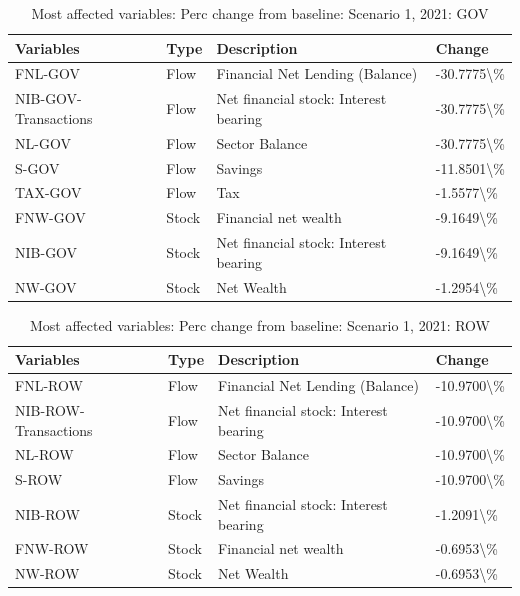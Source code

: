 \documentclass[
]{book}
\begin{document}
\begin{table}

\caption{\label{tab:most-affected-scenario-1-perc-2020-GOV}Most affected variables: Perc change from baseline: Scenario 1, 2021: GOV}
\centering
\fontsize{10}{12}\selectfont
\begin{tabular}[t]{l|l|l|l}
\hline
Variables & Type & Description & Change\\
\hline
FNL-GOV & Flow & Financial Net Lending (Balance) & -30.7775\textbackslash{}\%\\
\hline
NIB-GOV-Transactions & Flow & Net financial stock: Interest bearing & -30.7775\textbackslash{}\%\\
\hline
NL-GOV & Flow & Sector Balance & -30.7775\textbackslash{}\%\\
\hline
S-GOV & Flow & Savings & -11.8501\textbackslash{}\%\\
\hline
TAX-GOV & Flow & Tax & -1.5577\textbackslash{}\%\\
\hline
FNW-GOV & Stock & Financial net wealth & -9.1649\textbackslash{}\%\\
\hline
NIB-GOV & Stock & Net financial stock: Interest bearing & -9.1649\textbackslash{}\%\\
\hline
NW-GOV & Stock & Net Wealth & -1.2954\textbackslash{}\%\\
\hline
\end{tabular}
\end{table}

\begin{table}

\caption{\label{tab:most-affected-scenario-1-perc-2020-ROW}Most affected variables: Perc change from baseline: Scenario 1, 2021: ROW}
\centering
\fontsize{10}{12}\selectfont
\begin{tabular}[t]{l|l|l|l}
\hline
Variables & Type & Description & Change\\
\hline
FNL-ROW & Flow & Financial Net Lending (Balance) & -10.9700\textbackslash{}\%\\
\hline
NIB-ROW-Transactions & Flow & Net financial stock: Interest bearing & -10.9700\textbackslash{}\%\\
\hline
NL-ROW & Flow & Sector Balance & -10.9700\textbackslash{}\%\\
\hline
S-ROW & Flow & Savings & -10.9700\textbackslash{}\%\\
\hline
NIB-ROW & Stock & Net financial stock: Interest bearing & -1.2091\textbackslash{}\%\\
\hline
FNW-ROW & Stock & Financial net wealth & -0.6953\textbackslash{}\%\\
\hline
NW-ROW & Stock & Net Wealth & -0.6953\textbackslash{}\%\\
\hline
\end{tabular}
\end{table}
\end{document}
